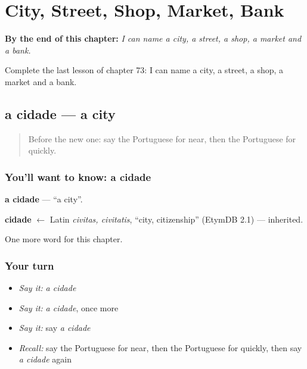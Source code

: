 
\chapter{City, Street, Shop, Market, Bank}
\label{ch:pt-city-street-shop-market-bank}

\begin{chapteropening}
\textbf{By the end of this chapter:} \emph{I can name a city, a street, a shop, a market and a bank.}

Complete the last lesson of chapter 73: I can name a city, a street, a shop, a market and a bank.
\end{chapteropening}

\section[a cidade]{a cidade — a city}

\label{lesson:PT-C73-cidade}



\begin{quote}
Before the new one: say the Portuguese for near, then the Portuguese for quickly.
\end{quote}

\subsection*{You'll want to know: a cidade}
\textbf{a cidade} — \textquotedblleft{}a city\textquotedblright{}.

\begin{cousinweb}
\textbf{cidade} $\leftarrow$ Latin \emph{civitas, civitatis}, \textquotedblleft{}city, citizenship\textquotedblright{} (EtymDB 2.1) — inherited.
\end{cousinweb}

\begin{grammarlens}[title={What you've built}]
One more word for this chapter.
\end{grammarlens}

\subsection*{Your turn}
\begin{itemize}
\raggedright
  \item \emph{Say it:} \emph{a cidade}
  \item \emph{Say it:} \emph{a cidade}, once more
  \item \emph{Say it:} say \emph{a cidade}
  \item \emph{Recall:} say the Portuguese for near, then the Portuguese for quickly, then say \emph{a cidade} again
\end{itemize}

